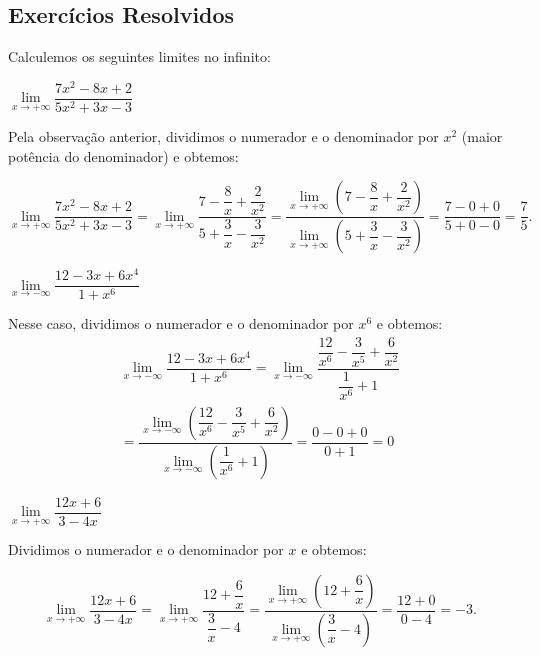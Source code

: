 \cleardoublepage\documentclass[../main.tex]{subfiles}
\begin{document}
\subsection{Exercícios Resolvidos}
\begin{exeresol}
  Calculemos os seguintes limites no infinito:\\
  \begin{compactenum}[a)]
  \item \(\lim\limits_{x \to +\infty}\dfrac{7x^2-8x+2}{5x^2+3x-3}\)\\
   \begin{resol}
  Pela observação anterior, dividimos o numerador e o denominador por \(x^2\) (maior potência do denominador) e obtemos:

\[ \lim\limits_{x \to +\infty}\dfrac{7x^2-8x+2}{5x^2+3x-3}= \lim\limits_{x \to +\infty}\dfrac{7-\dfrac{8}{x}+\dfrac{2}{x^2}}{5+\dfrac{3}{x}-\dfrac{3}{x^2}}= \dfrac{\lim\limits_{x \to +\infty} \left(7-\dfrac{8}{x}+\dfrac{2}{x^2} \right)}{\lim\limits_{x \to +\infty}\left(5+\dfrac{3}{x}-\dfrac{3}{x^2}\right)}=\dfrac{7-0+0}{5+0-0}=\dfrac{7}{5}. \]
  \end{resol}
 
  \item \(\lim\limits_{x \to -\infty}\dfrac{12-3x+6x^4}{1+x^6}\)\\
  \begin{resol}
  Nesse caso, dividimos o numerador e o denominador por \(x^6\) e obtemos:
  \begin{align*}
    \lim\limits_{x \to -\infty}\dfrac{12-3x+6x^4}{1+x^6}= \lim\limits_{x \to -\infty}\dfrac{\dfrac{12}{x^6}-\dfrac{3}{x^5}+\dfrac{6}{x^2}}{\dfrac{1}{x^6}+1}\\=\dfrac{\lim\limits_{x \to -\infty} \left( \dfrac{12}{x^6}-\dfrac{3}{x^5}+\dfrac{6}{x^2}\right)}{\lim\limits_{x \to -\infty}\left(\dfrac{1}{x^6}+1 \right)}=\dfrac{0-0+0}{0+1}=0
\end{align*}
  \end{resol}
  \item \(\lim\limits_{x \to +\infty}\dfrac{12x+6}{3-4x}\)\\
  \begin{resol}
  Dividimos o numerador e o denominador por \(x\) e obtemos:

\[ \lim\limits_{x \to +\infty}\dfrac{12x+6}{3-4x}= \lim\limits_{x \to +\infty}\dfrac{12+\dfrac{6}{x}}{\dfrac{3}{x}-4}= \dfrac{\lim\limits_{x \to +\infty} \left( 12+\dfrac{6}{x}\right)}{\lim\limits_{x \to +\infty}\left({\dfrac{3}{x}-4} \right)}=\dfrac{12+0}{0-4}=-3. \]
  \end{resol}
  \end{compactenum}
  \end{exeresol}
\end{document}
